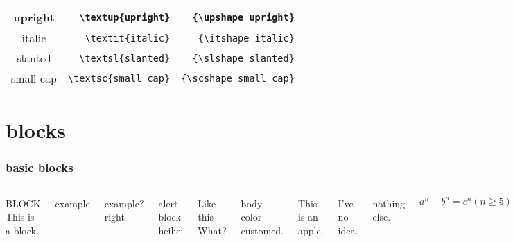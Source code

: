 \documentclass[11pt]{beamer}
\begin{document}
\begin{frame}
\begin{description}
{\begin{footnotesize}
\begin{table}[bt]
\begin{tabular}{|c|r|r|}
upright & \verb|\textup{upright}| & \verb|{\upshape upright}|\\\hline
italic & \verb|\textit{italic}| & \verb|{\itshape italic}|\\\hline
slanted & \verb|\textsl{slanted}| & \verb|{\slshape slanted}|\\\hline
small cap & \verb|\textsc{small cap}| & \verb|{\scshape small cap}|\\\hline
\end{tabular}
\end{table}
\end{footnotesize}
}
\end{description}
\end{frame}


\section{blocks}
\begin{frame}
\frametitle{basic blocks}
\begin{columns}
\begin{block}{BLOCK}
This is a block.
\end{block}
\begin{example}[\ding{172}]
example
\end{example}
\begin{exampleblock}{example?}
right
\end{exampleblock}
\begin{alertblock}{alert block}
heihei
\end{alertblock}
\begin{beamerboxesrounded}[upper=head,lower=body,shadow=true]{Like this}
What?
\end{beamerboxesrounded}
\pause
{}
\begin{beamercolorbox}[wd=3cm,shadow=true, rounded=true]{body}
color customed.
\end{beamercolorbox}
\begin{definition}
This is an apple.
\end{definition}
\begin{corollary}
I've no idea.
\end{corollary}
\begin{Theorem}[Ferm\`at's]
nothing else.
\end{Theorem}
\begin{Proof}
$a^n+b^n=c^n(n\geq 5)$
\end{Proof}
\end{columns}
\end{frame}
\end{document}
